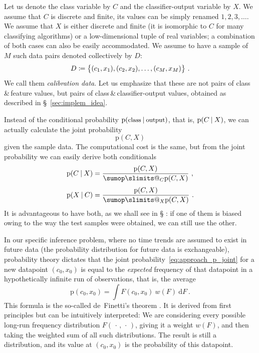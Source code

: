 \documentclass[\ifafour a4paper,12pt,\else a5paper,10pt,\fi%
onecolumn,oneside,article,%
british%
]{memoir}
\makeatletter
\theoremstyle{remark}
\theoremstyle{innote}
\def\sum{\DOTSI\sumop\slimits@}
\newcommand*{\amp}{\&}
\newcommand*{\di}{\mathrm{d}}%
\newcommand*{\defd}{\coloneqq}
\newcommand*{\dotv}{\mathord{\,\cdot\,}}%
\DeclarePairedDelimiter\set{\{}{\}} %
\newcommand*{\p}{\mathrm{p}}%
\renewcommand*{\|}[1][]{\nonscript\:#1\vert\nonscript\:\mathopen{}}
\newcommand*{\sect}{\S}%
\newcommand*{\chap}{ch.}%
\newcommand*{\pencil}{{\fontencoding{U}\fontfamily{fontawesometwo}\selectfont\symbol{210}}}
\newcommand{\mynote}[1]{ {\color{notecolour}#1}}
\newcommand*{\wf}{w}
\makeatother
\begin{document}
Let us denote the class variable by $C$ and the classifier-output variable by $X$. We assume that $C$ is discrete and finite, its values can be simply renamed $1,2,3,\dotsc$. We assume that $X$ is either discrete and finite (it is isomorphic to $C$ for many classifying algorithms) or a low-dimensional tuple of real variables; a combination of both cases can also be easily accommodated. We assume to have a sample of $M$ such data pairs denoted collectively by $D$:
\begin{equation}
  \label{eq:sample_data_notation}
  D \defd \set[\big]{(c_{1}, x_{1}), (c_{2}, x_{2}), \dotsc, (c_{M}, x_{M}) } \ .
\end{equation}
We call them \emph{calibration data}. Let us emphasize that these are not pairs of class\,\amp\,feature values, but pairs of class\,\amp\,classifier-output values, obtained as described in \sect~\ref{sec:implem_idea}.

Instead of the conditional probability $\p(\text{\small class} \| \text{\small output})$, that is, $\p(C \| X)$,  we can actually calculate the joint probability
\begin{equation}
  \label{eq:approach_p_joint}
  \p(C, X)
\end{equation}
given the sample data. The computational cost is the same, but from the joint probability we can easily derive both conditionals
\begin{align}
  \label{eq:approach_p_conditional_direct}
  \p(C \| X) &= \frac{\p(C, X)}{ \sum_{C} \p(C, X) } \ ,
  \\[\jot]
  \label{eq:approach_p_conditional_inverse}
  \p(X \| C) &= \frac{\p(C, X)}{ \sum_{X} \p(C, X) } \ .
\end{align}
It is advantageous to have both, as we shall see in \sect\mynote{\pencil}: if one of them is biased owing to the way the test samples were obtained, we can still use the other.

In our specific inference problem, where no time trends are assumed to exist in future data (the probability distribution for future data is exchangeable), probability theory dictates that the joint probability~\eqref{eq:approach_p_joint} for a new datapoint $(c_{0}, x_{0})$ is equal to the \emph{expected} frequency of that datapoint  in a hypothetically infinite run of observations, that is, the average
\begin{equation}
  \label{eq:prob_is_expe_freq}
  \p(c_{0}, x_{0}) = \int\! F(c_{0}, x_{0})\ \wf(F)\ \di F \ .
\end{equation}
This formula is the so-called de~Finetti's theorem \autocites[\chap~4]{bernardoetal1994_r2000}{dawid2013,definetti1929,definetti1937}. It is derived from first principles but can be intuitively interpreted: We are considering every possible long-run frequency distribution $F(\dotv, \dotv)$, giving it a weight $\wf(F)$, and then taking the weighted sum of all such distributions. The result is still a distribution, and its value at $(c_{0}, x_{0})$ is the probability of this datapoint.
\end{document}
